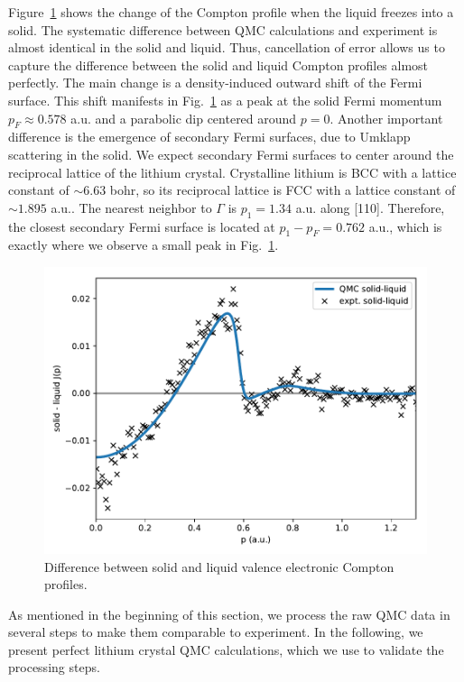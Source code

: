 \documentclass[aps,prb,showpacs,preprintnumbers,amsmath,amssymb,superscriptaddress,twocolumn]{revtex4-1}
\begin{document}
Figure~\ref{fig:s-l-djp} shows the change of the Compton profile when the liquid freezes into a solid. The systematic difference  between QMC calculations and experiment is almost identical in the solid and liquid. Thus, cancellation of error allows us to capture the difference between the solid and liquid Compton profiles almost perfectly.
The main change is a density-induced outward shift of the Fermi surface. This shift manifests in Fig.~\ref{fig:s-l-djp} as a peak at the solid Fermi momentum $p_F\approx0.578$ a.u. and a parabolic dip centered around $p=0$. Another important difference is the emergence of secondary Fermi surfaces, due to Umklapp scattering in the solid. We expect secondary Fermi surfaces to center around the reciprocal lattice of the lithium crystal. Crystalline lithium is BCC with a lattice constant of $\sim 6.63$ bohr, so its reciprocal lattice is FCC with a lattice constant of $\sim 1.895$ a.u.. The nearest neighbor to $\Gamma$ is $p_1=1.34$ a.u.  along [110]. Therefore, the closest secondary Fermi surface is located at $p_1-p_F=0.762$ a.u., which is exactly where we observe a small peak in Fig.~\ref{fig:s-l-djp}.

\begin{figure}[h]
\includegraphics[width=\linewidth]{li52e_sl-djp}
\caption{Difference between solid and liquid valence electronic Compton profiles.\label{fig:s-l-djp}}
\end{figure}

As mentioned in the beginning of this section, we process the raw QMC data in several steps to make them comparable to experiment. In the following, we present perfect lithium crystal QMC calculations, which we use to validate the processing steps.
\end{document}
